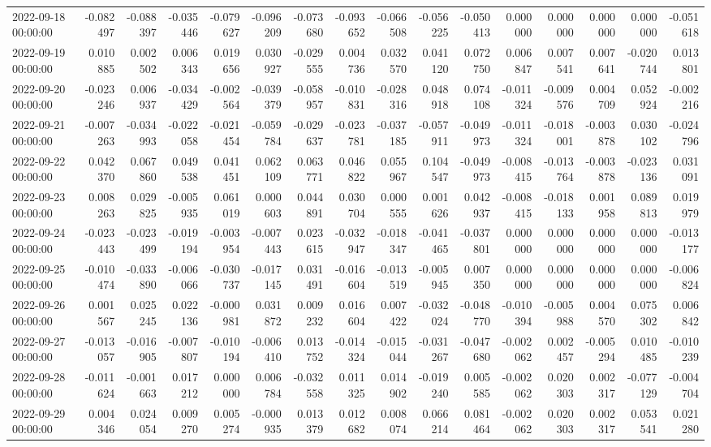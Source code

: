 \begin{tabular}{lrrrrrrrrrrrrrrr}
2022-09-18 00:00:00 & -0.082497 & -0.088397 & -0.035446 & -0.079627 & -0.096209 & -0.073680 & -0.093652 & -0.066508 & -0.056225 & -0.050413 & 0.000000 & 0.000000 & 0.000000 & 0.000000 & -0.051618 \\
2022-09-19 00:00:00 & 0.010885 & 0.002502 & 0.006343 & 0.019656 & 0.030927 & -0.029555 & 0.004736 & 0.032570 & 0.041120 & 0.072750 & 0.006847 & 0.007541 & 0.007641 & -0.020744 & 0.013801 \\
2022-09-20 00:00:00 & -0.023246 & 0.006937 & -0.034429 & -0.002564 & -0.039379 & -0.058957 & -0.010831 & -0.028316 & 0.048918 & 0.074108 & -0.011324 & -0.009576 & 0.004709 & 0.052924 & -0.002216 \\
2022-09-21 00:00:00 & -0.007263 & -0.034993 & -0.022058 & -0.021454 & -0.059784 & -0.029637 & -0.023781 & -0.037185 & -0.057911 & -0.049973 & -0.011324 & -0.018001 & -0.003878 & 0.030102 & -0.024796 \\
2022-09-22 00:00:00 & 0.042370 & 0.067860 & 0.049538 & 0.041451 & 0.062109 & 0.063771 & 0.046822 & 0.055967 & 0.104547 & -0.049973 & -0.008415 & -0.013764 & -0.003878 & -0.023136 & 0.031091 \\
2022-09-23 00:00:00 & 0.008263 & 0.029825 & -0.005935 & 0.061019 & 0.000603 & 0.044891 & 0.030704 & 0.000555 & 0.001626 & 0.042937 & -0.008415 & -0.018133 & 0.001958 & 0.089813 & 0.019979 \\
2022-09-24 00:00:00 & -0.023443 & -0.023499 & -0.019194 & -0.003954 & -0.007443 & 0.023615 & -0.032947 & -0.018347 & -0.041465 & -0.037801 & 0.000000 & 0.000000 & 0.000000 & 0.000000 & -0.013177 \\
2022-09-25 00:00:00 & -0.010474 & -0.033890 & -0.006066 & -0.030737 & -0.017145 & 0.031491 & -0.016604 & -0.013519 & -0.005945 & 0.007350 & 0.000000 & 0.000000 & 0.000000 & 0.000000 & -0.006824 \\
2022-09-26 00:00:00 & 0.001567 & 0.025245 & 0.022136 & -0.000981 & 0.031872 & 0.009232 & 0.016604 & 0.007422 & -0.032024 & -0.048770 & -0.010394 & -0.005988 & 0.004570 & 0.075302 & 0.006842 \\
2022-09-27 00:00:00 & -0.013057 & -0.016905 & -0.007807 & -0.010194 & -0.006410 & 0.013752 & -0.014324 & -0.015044 & -0.031267 & -0.047680 & -0.002062 & 0.002457 & -0.005294 & 0.010485 & -0.010239 \\
2022-09-28 00:00:00 & -0.011624 & -0.001663 & 0.017212 & 0.000000 & 0.006784 & -0.032558 & 0.011325 & 0.014902 & -0.019240 & 0.005585 & -0.002062 & 0.020303 & 0.002317 & -0.077129 & -0.004704 \\
2022-09-29 00:00:00 & 0.004346 & 0.024054 & 0.009270 & 0.005274 & -0.000935 & 0.013379 & 0.012682 & 0.008074 & 0.066214 & 0.081464 & -0.002062 & 0.020303 & 0.002317 & 0.053541 & 0.021280 \\

\end{tabular}
